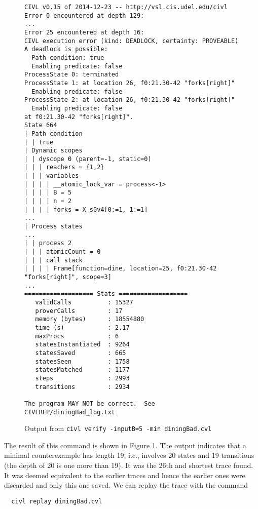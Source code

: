 \begin{figure}[t]
  \begin{small}
\begin{verbatim}
CIVL v0.15 of 2014-12-23 -- http://vsl.cis.udel.edu/civl
Error 0 encountered at depth 129:
...
Error 25 encountered at depth 16:
CIVL execution error (kind: DEADLOCK, certainty: PROVEABLE)
A deadlock is possible:
  Path condition: true
  Enabling predicate: false
ProcessState 0: terminated
ProcessState 1: at location 26, f0:21.30-42 "forks[right]"
  Enabling predicate: false
ProcessState 2: at location 26, f0:21.30-42 "forks[right]"
  Enabling predicate: false
at f0:21.30-42 "forks[right]".
State 664
| Path condition
| | true
| Dynamic scopes
| | dyscope 0 (parent=-1, static=0)
| | | reachers = {1,2}
| | | variables
| | | | __atomic_lock_var = process<-1>
| | | | B = 5
| | | | n = 2
| | | | forks = X_s0v4[0:=1, 1:=1]
...
| Process states
...
| | process 2
| | | atomicCount = 0
| | | call stack
| | | | Frame[function=dine, location=25, f0:21.30-42 "forks[right]", scope=3]
...
=================== Stats ===================
   validCalls          : 15327
   proverCalls         : 17
   memory (bytes)      : 18554880
   time (s)            : 2.17
   maxProcs            : 6
   statesInstantiated  : 9264
   statesSaved         : 665
   statesSeen          : 1758
   statesMatched       : 1177
   steps               : 2993
   transitions         : 2934

The program MAY NOT be correct.  See CIVLREP/diningBad_log.txt
\end{verbatim}
  \end{small}
  \caption{Output from \texttt{civl verify -inputB=5 -min diningBad.cvl}}
  \label{fig:diningOut}
\end{figure}

The result of this command is shown in Figure \ref{fig:diningOut}. The
output indicates that a minimal counterexample has length 19, i.e.,
involves 20 states and 19 transitions (the depth of 20 is one more
than 19).    It was the 26th and shortest trace found.  It was deemed
equivalent to the earlier traces and hence the earlier ones were
discarded and only this one saved.  We can replay the trace with the command
\begin{verbatim}
  civl replay diningBad.cvl
\end{verbatim}

